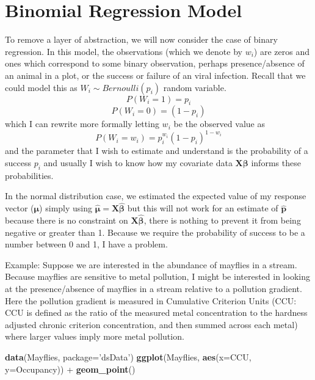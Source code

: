 \documentclass[]{book}
\newenvironment{Shaded}{\begin{snugshade}}{\end{snugshade}}
\newcommand{\KeywordTok}[1]{\textcolor[rgb]{0.13,0.29,0.53}{\textbf{{#1}}}}
\newcommand{\DataTypeTok}[1]{\textcolor[rgb]{0.13,0.29,0.53}{{#1}}}
\newcommand{\StringTok}[1]{\textcolor[rgb]{0.31,0.60,0.02}{{#1}}}
\newcommand{\NormalTok}[1]{{#1}}
\theoremstyle{definition}
\theoremstyle{definition}
\theoremstyle{remark}
\begin{document}
\section{Binomial Regression Model}\label{binomial-regression-model}

To remove a layer of abstraction, we will now consider the case of
binary regression. In this model, the observations (which we denote by
\(w_{i}\)) are zeros and ones which correspond to some binary
observation, perhaps presence/absence of an animal in a plot, or the
success or failure of an viral infection. Recall that we could model
this as \(W_{i}\sim Bernoulli\left(p_{i}\right)\) random variable.
\[P\left(W_{i}=1\right) =   p_{i}\]
\[P\left(W_{i}=0\right) =   \left(1-p_{i}\right)\] which I can rewrite
more formally letting \(w_{i}\) be the observed value as
\[P\left(W_{i}=w_{i}\right)=p_{i}^{w_{i}}\left(1-p_{i}\right)^{1-w_{i}}\]
and the parameter that I wish to estimate and understand is the
probability of a success \(p_{i}\) and usually I wish to know how my
covariate data \(\boldsymbol{X\beta}\) informs these probabilities.

In the normal distribution case, we estimated the expected value of my
response vector (\(\boldsymbol{\mu}\)) simply using
\(\hat{\boldsymbol{\mu}}=\boldsymbol{X}\hat{\boldsymbol{\beta}}\) but
this will not work for an estimate of \(\hat{\boldsymbol{p}}\) because
there is no constraint on \(\boldsymbol{X}\hat{\boldsymbol{\beta}}\),
there is nothing to prevent it from being negative or greater than 1.
Because we require the probability of success to be a number between 0
and 1, I have a problem.

Example: Suppose we are interested in the abundance of mayflies in a
stream. Because mayflies are sensitive to metal pollution, I might be
interested in looking at the presence/absence of mayflies in a stream
relative to a pollution gradient. Here the pollution gradient is
measured in Cumulative Criterion Units (CCU: CCU is defined as the ratio
of the measured metal concentration to the hardness adjusted chronic
criterion concentration, and then summed across each metal) where larger
values imply more metal pollution.

\begin{Shaded}
\begin{Highlighting}[]
\KeywordTok{data}\NormalTok{(Mayflies, }\DataTypeTok{package=}\StringTok{'dsData'}\NormalTok{)}
\KeywordTok{ggplot}\NormalTok{(Mayflies, }\KeywordTok{aes}\NormalTok{(}\DataTypeTok{x=}\NormalTok{CCU, }\DataTypeTok{y=}\NormalTok{Occupancy)) +}\StringTok{ }\KeywordTok{geom_point}\NormalTok{()}
\end{Highlighting}
\end{Shaded}
\end{document}
